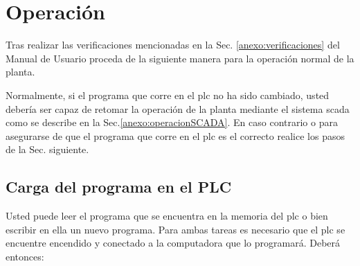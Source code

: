 \section{Operación}
\label{anexo:operacion}

Tras realizar las verificaciones mencionadas en la Sec. 
\ref{anexo:verificaciones} del Manual de Usuario proceda de la siguiente
manera para la operación normal de la planta.

Normalmente, si el programa que corre en el \gls{plc} no ha sido cambiado, 
usted debería ser capaz de retomar la operación de la planta mediante el 
sistema \gls{scada} como se describe en la Sec.\ref{anexo:operacionSCADA}. 
En caso contrario o para asegurarse de que el programa que corre en el 
\gls{plc} es el correcto  realice los pasos de la Sec. siguiente.

\subsection{Carga del programa en el PLC}
\label{anexo:operacionPLC}

Usted puede leer el programa que se encuentra en la memoria del \gls{plc} o 
bien escribir en ella un nuevo programa.
Para ambas tareas es necesario que el \gls{plc} se encuentre encendido y
conectado a la computadora que lo programará.
Deberá entonces:

